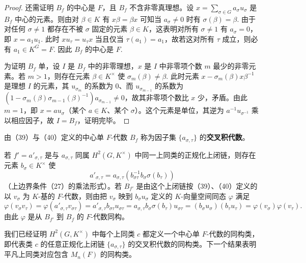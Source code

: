 \begin{proof}
还需证明 \(B_f\) 的中心是 \(F\)，且 \(B_f\) 不含非零真理想。设 \(x = \sum_{\sigma \in G}a_\sigma u_\sigma\) 是 \(B_f\) 中心的元素。则由对 \(\beta \in K\) 有 \(x\beta = \beta x\) 可知当 \(a_\sigma \neq 0\) 时有 \(\sigma(\beta) = \beta\). 由于对任何 \(\sigma \neq 1\) 都存在不被 \(\sigma\) 固定的元素 \(\beta \in K\)，这表明对所有 \(\sigma \neq 1\) 有 \(a_\sigma = 0\)，即 \(x = a_1u_1\). 此时 \(xu_\tau = u_\tau x\) 当且仅当 \(\tau(a_1) = a_1\)，故若这对所有 \(\tau\) 成立，则必有 \(a_1 \in K^G = F\). 因此 \(B_f\) 的中心是 \(F\).

为证明 \(B_f\) 单，设 \(I\) 是 \(B_f\) 中的非零理想，\(x\) 是 \(I\) 中非零项个数 \(m\) 最少的非零元素。若 \(m > 1\)，则存在元素 \(\beta \in K^\times\) 使 \(\sigma_m(\beta) \neq \beta\). 此时元素 \(x-\sigma_m(\beta)x\beta^{-1}\) 是理想 \(I\) 的元素，其 \(u_{\sigma_m}\) 的系数为 0、而 \(u_{\sigma_{m-1}}\) 的系数为 \((1-\sigma_m(\beta)\sigma_{m-1}(\beta)^{-1})a_{\sigma_{m-1}} \neq 0\)，故其非零项个数比 \(x\) 少，矛盾。由此 \(m = 1\)，即 \(x = au_\sigma\)（某个 \(a \in K\)、某个 \(\sigma\)）。这个元素是单位，其逆为 \(a^{-1}u_{\sigma^{-1}}\) 乘以相应因子，故 \(I = B_f\)，证明完毕。
\end{proof}

\begin{definition}
由（39）与（40）定义的中心单 \(F\)-代数 \(B_f\) 称为因子集 \(\{a_{\sigma,\tau}\}\) 的\textbf{交叉积代数}。
\end{definition}

若 \(f' = a'_{\sigma,\tau}\) 是与 \(a_{\sigma,\tau}\) 同属 \(H^2(G, K^\times)\) 中同一上同类的正规化上闭链，则存在元素 \(b_\sigma \in K^\times\) 使
\[
a'_{\sigma,\tau} = a_{\sigma,\tau}(b_{\sigma\tau}^{-1}b_\sigma\sigma(b_\tau))
\]
（上边界条件（27）的乘法形式）。若 \(B_{f'}\) 是由这个上闭链按（39）、（40）定义的以 \(v_\sigma\) 为 \(K\)-基的 \(F\)-代数，则由把 \(v_\sigma\) 映到 \(b_\sigma u_\sigma\) 定义的 \(K\)-向量空间同态 \(\varphi\) 满足
\[
\varphi(v_\sigma v_\tau) = \varphi(a'_{\sigma,\tau}v_{\sigma\tau}) = a'_{\sigma,\tau}b_{\sigma\tau}u_{\sigma\tau} = a_{\sigma,\tau}b_\sigma\sigma(b_\tau)u_{\sigma\tau} = (b_\sigma u_\sigma)(b_\tau u_\tau) = \varphi(v_\sigma)\varphi(v_\tau).
\]
由此 \(\varphi\) 是从 \(B_{f'}\) 到 \(B_f\) 的 \(F\)-代数同构。

我们已经证明 \(H^2(G, K^\times)\) 中每个上同类 \(c\) 都定义一个中心单 \(F\)-代数的同构类，即代表类 \(c\) 的任意正规化上闭链 \(\{a_{\sigma,\tau}\}\) 的交叉积代数的同构类。下一个结果表明平凡上同类对应包含 \(M_n(F)\) 的同构类。

